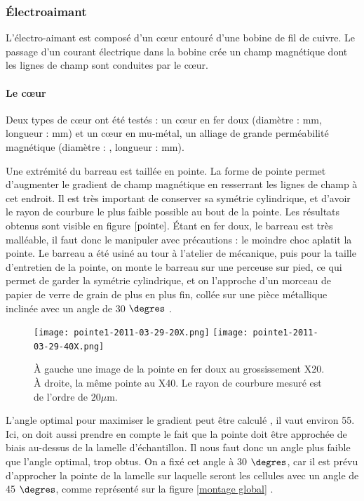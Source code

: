 		\subsubsection{\'Electroaimant}
		L'électro-aimant est composé d'un c\oe ur entouré d'une bobine de fil de cuivre. Le passage d'un courant électrique dans la bobine crée un champ magnétique dont les lignes de champ sont conduites par le c\oe ur. 
		
		\paragraph{Le c\oe ur} Deux types de c\oe ur ont été testés : un c\oe ur en fer doux (diamètre : mm, longueur : mm) et un c\oe ur en mu-métal, un alliage de grande perméabilité magnétique (diamètre :  , longueur : mm).
		
		Une extrémité du barreau est taillée en pointe. La forme de pointe permet d'augmenter le gradient de champ magnétique en resserrant les lignes de champ à cet endroit. Il est très important de conserver sa symétrie cylindrique, et d'avoir le rayon de courbure le plus faible possible au bout de la pointe. Les résultats obtenus sont visible en figure $\ref{pointe}$. \'Etant en fer doux, le barreau est très malléable, il faut donc le manipuler avec précautions : le moindre choc aplatit la pointe. 
	 Le barreau a été usiné au tour à l'atelier de mécanique, puis pour la taille d'entretien de la pointe, on monte le barreau sur une perceuse sur pied, ce qui permet de garder la symétrie cylindrique, et on l'approche d'un morceau de papier de verre de grain de plus en plus fin, collée sur une pièce métallique inclinée avec un angle de 30 $\degres$ .
	 
	 \begin{figure}[ht!]%
\texttt{[image: pointe1-2011-03-29-20X.png]}%
\texttt{[image: pointe1-2011-03-29-40X.png]}
\caption{À gauche une image de la pointe en fer doux au grossissement X20. À droite, la même pointe au X40. Le rayon de courbure mesuré est de l'ordre de 20$\mu$m.}%
\label{pointe}
\end{figure}
	 
	 L'angle optimal pour maximiser le gradient peut être calculé \parencite{durand_electrostatique_1953}, il vaut environ 55\degres. Ici, on doit aussi prendre en compte le fait que la pointe doit être approchée de biais au-dessus de la lamelle d'échantillon. Il nous faut donc un angle plus faible que l'angle optimal, trop obtus. On a fixé cet angle à 30 $\degres$, car il est prévu d'approcher la pointe de la lamelle sur laquelle seront les cellules avec un angle de 45 $\degres$, comme représenté sur la figure \ref{montage global} .

